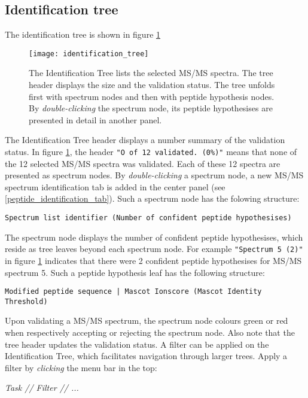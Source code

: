 \subsection{Identification tree}
The identification tree is shown in figure \ref{identification_tree}
\begin{figure}[t!]
\begin{center}
	\texttt{[image: identification\_tree]}
	\caption{\label{identification_tree}The Identification Tree lists the selected MS/MS spectra. The tree header displays the size and the validation status. The tree unfolds first with spectrum nodes and then with peptide hypothesis nodes. By \textit{double-clicking }the spectrum node, its peptide hypothesises are presented in detail in another panel.}
\end{center}
\end{figure}
%
\npar The Identification Tree header displays a number summary of the validation status. In figure \ref{identification_tree}, the header \verb!"O of 12 validated. (0%)"! means that none of the 12 selected MS/MS spectra was validated. Each of these 12 spectra are presented as spectrum nodes. By \textit{double-clicking }a spectrum node, a new MS/MS spectrum identification tab is added in the center panel (see \ref{peptide_identification_tab}). Such a spectrum node has the folowing structure:\begin{verbatim}Spectrum list identifier (Number of confident peptide hypothesises)\end{verbatim}
The spectrum node displays the number of confident peptide hypothesises, which reside as tree leaves beyond each spectrum node. For example \verb!"Spectrum 5 (2)"! in figure \ref{identification_tree} indicates that there were 2 confident peptide hypothesises for MS/MS spectrum 5. Such a peptide hypothesis leaf has the following structure:\begin{verbatim}Modified peptide sequence | Mascot Ionscore (Mascot Identity Threshold)\end{verbatim}
\npar Upon validating a MS/MS spectrum, the spectrum node colours green or red when respectively accepting or rejecting the spectrum node. Also note that the tree header updates the validation status.
\npar A filter can be applied on the Identification Tree, which facilitates navigation through larger trees.
\npar Apply a filter by \textit{clicking }the menu bar in the top:
%
\begin{center}
\textit{Task // Filter // ...}	
\end{center}
